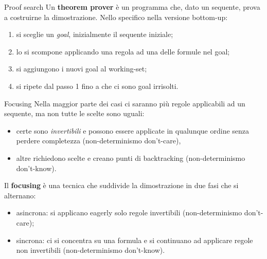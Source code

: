 \documentclass{beamer}
\begin{document}
\begin{frame}{Proof search}
	Un \textbf{theorem prover} è un programma che, dato un sequente, prova a costruirne la dimostrazione.
	Nello specifico nella versione bottom-up:
	\begin{enumerate}
		\item si sceglie un \textit{goal}, inizialmente il sequente iniziale;
		\item lo si scompone applicando una regola ad una delle formule nel goal;
		\item si aggiungono i nuovi goal al working-set;
		\item si ripete dal passo 1 fino a che ci sono goal irrisolti.
	\end{enumerate}
\end{frame}

\begin{frame}{Focusing}
	Nella maggior parte dei casi ci saranno più regole applicabili ad un sequente, ma non tutte le scelte sono uguali:
	\begin{itemize}
		\item certe sono \textit{invertibili} e possono essere applicate in qualunque ordine senza perdere completezza (non-determinismo don't-care),
		\item altre richiedono scelte e creano punti di backtracking (non-determinismo don't-know).
	\end{itemize}
	Il \textbf{focusing} è una tecnica che suddivide la dimostrazione in due fasi che si alternano:
	\begin{itemize}
		\item asincrona: si applicano eagerly solo regole invertibili (non-determinismo don't-care);
		\item sincrona: ci si concentra su una formula e si continuano ad applicare regole non invertibili (non-determinismo don't-know).
	\end{itemize}
\end{frame}
\end{document}
